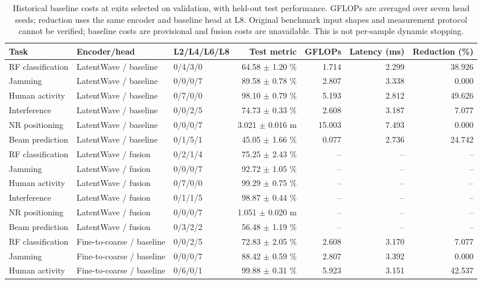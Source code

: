 \begin{table}[t]
\centering
\caption{Historical baseline costs at exits selected on validation, with held-out test performance. GFLOPs are averaged over seven head seeds; reduction uses the same encoder and baseline head at L8. Original benchmark input shapes and measurement protocol cannot be verified; baseline costs are provisional and fusion costs are unavailable. This is not per-sample dynamic stopping.}
\begin{tabular}{lllrrrr}
\hline
Task & Encoder/head & L2/L4/L6/L8 & Test metric & GFLOPs & Latency (ms) & Reduction (\%) \\
\hline
RF classification & LatentWave / baseline & 0/4/3/0 & 64.58 $\pm$ 1.20 \% & 1.714 & 2.299 & 38.926 \\
Jamming & LatentWave / baseline & 0/0/0/7 & 89.58 $\pm$ 0.78 \% & 2.807 & 3.338 & 0.000 \\
Human activity & LatentWave / baseline & 0/7/0/0 & 98.10 $\pm$ 0.79 \% & 5.193 & 2.812 & 49.626 \\
Interference & LatentWave / baseline & 0/0/2/5 & 74.73 $\pm$ 0.33 \% & 2.608 & 3.187 & 7.077 \\
NR positioning & LatentWave / baseline & 0/0/0/7 & 3.021 $\pm$ 0.016 m & 15.003 & 7.493 & 0.000 \\
Beam prediction & LatentWave / baseline & 0/1/5/1 & 45.05 $\pm$ 1.66 \% & 0.077 & 2.736 & 24.742 \\
RF classification & LatentWave / fusion & 0/2/1/4 & 75.25 $\pm$ 2.43 \% & -- & -- & -- \\
Jamming & LatentWave / fusion & 0/0/0/7 & 92.72 $\pm$ 1.05 \% & -- & -- & -- \\
Human activity & LatentWave / fusion & 0/7/0/0 & 99.29 $\pm$ 0.75 \% & -- & -- & -- \\
Interference & LatentWave / fusion & 0/1/1/5 & 98.87 $\pm$ 0.44 \% & -- & -- & -- \\
NR positioning & LatentWave / fusion & 0/0/0/7 & 1.051 $\pm$ 0.020 m & -- & -- & -- \\
Beam prediction & LatentWave / fusion & 0/3/2/2 & 56.48 $\pm$ 1.19 \% & -- & -- & -- \\
RF classification & Fine-to-coarse / baseline & 0/0/2/5 & 72.83 $\pm$ 2.05 \% & 2.608 & 3.170 & 7.077 \\
Jamming & Fine-to-coarse / baseline & 0/0/0/7 & 88.42 $\pm$ 0.59 \% & 2.807 & 3.392 & 0.000 \\
Human activity & Fine-to-coarse / baseline & 0/6/0/1 & 99.88 $\pm$ 0.31 \% & 5.923 & 3.151 & 42.537 \\

\end{tabular}
\end{table}
